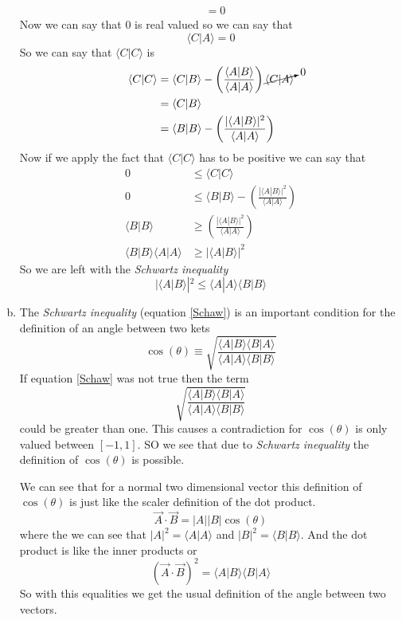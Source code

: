 \documentclass[11pt]{article}
\numberwithin{equation}{section}
\newcommand{\norm}[2]{\langle{#1}|{#2}\rangle}
\begin{document}
\begin{enumerate}[(a)]
\begin{align*}
&= 0
\end{align*}
Now we can say that 0 is real valued so we can say that
$$\norm{C}{A} = 0$$
So we can say that $\norm{C}{C}$ is
\begin{align*}
\norm{C}{C} &=\norm{C}{B}-\left(\frac{\norm{A}{B}}{\norm{A}{A}}\right)\cancelto{0}{\norm{C}{A}}\\
&= \norm{C}{B}\\
&= \norm{B}{B}-\left(\frac{|\norm{A}{B}|^2}{\norm{A}{A}}\right)
\end{align*}
Now if we apply the fact that $\norm{C}{C}$ has to be positive we can say that
\begin{align*}
0 &\le \norm{C}{C}\\
0 &\le \norm{B}{B}-\left(\frac{|\norm{A}{B}|^2}{\norm{A}{A}}\right)\\
\norm{B}{B} &\ge \left(\frac{|\norm{A}{B}|^2}{\norm{A}{A}}\right)\\
\norm{B}{B}\norm{A}{A} &\ge |\norm{A}{B}|^2
\end{align*}
So we are left with the \emph{Schwartz inequality}
\begin{equation}
|\norm{A}{B}|^2 \le \norm{A}{A}\norm{B}{B}
\label{Schaw}
\end{equation}

\item
The \emph{Schwartz inequality} (equation \ref{Schaw}) is an important condition for the definition of an angle between two kets 
$$\cos(\theta) \equiv \sqrt{\frac{\norm{A}{B}\norm{B}{A}}{\norm{A}{A}\norm{B}{B}}}$$
If equation \ref{Schaw} was not true then the term 
$$\sqrt{\frac{\norm{A}{B}\norm{B}{A}}{\norm{A}{A}\norm{B}{B}}}$$
could be greater than one. This causes a contradiction for $\cos(\theta)$ is only valued between $[-1,1]$. SO we see that due to \emph{Schwartz inequality} the definition of $\cos(\theta)$ is possible.

We can see that for a normal two dimensional vector this definition of $\cos(\theta)$ is just like the scaler definition of the dot product.
$$\vec{A}\cdot\vec{B} = |A||B|\cos(\theta)$$
where the we can see that $|A|^2 = \norm{A}{A}$ and $|B|^2 = \norm{B}{B}$. And the dot product is like the inner products or 
$$(\vec{A}\cdot\vec{B})^2 = \norm{A}{B}\norm{B}{A}$$
So with this equalities we get the usual definition of the angle between two vectors.
\end{enumerate}
\end{document}
